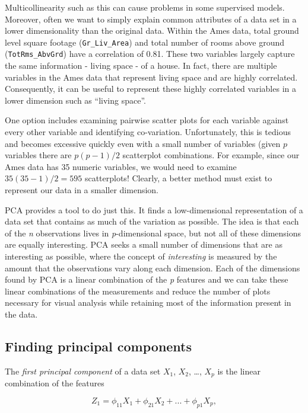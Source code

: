 \documentclass[]{book}
\theoremstyle{definition}
\theoremstyle{definition}
\theoremstyle{definition}
\theoremstyle{remark}
\begin{document}
Multicollinearity such as this can cause problems in some supervised
models. Moreover, often we want to simply explain common attributes of a
data set in a lower dimensionality than the original data. Within the
Ames data, total ground level square footage (\texttt{Gr\_Liv\_Area})
and total number of rooms above ground (\texttt{TotRms\_AbvGrd}) have a
correlation of 0.81. These two variables largely capture the same
information - living space - of a house. In fact, there are multiple
variables in the Ames data that represent living space and are highly
correlated. Consequently, it can be useful to represent these highly
correlated variables in a lower dimension such as ``living space''.

One option includes examining pairwise scatter plots for each variable
against every other variable and identifying co-variation.
Unfortunately, this is tedious and becomes excessive quickly even with a
small number of variables (given \(p\) variables there are \(p(p-1)/2\)
scatterplot combinations. For example, since our Ames data has 35
numeric variables, we would need to examine \(35(35-1)/2 = 595\)
scatterplots! Clearly, a better method must exist to represent our data
in a smaller dimension.

PCA provides a tool to do just this. It finds a low-dimensional
representation of a data set that contains as much of the variation as
possible. The idea is that each of the \emph{n} observations lives in
\emph{p}-dimensional space, but not all of these dimensions are equally
interesting. PCA seeks a small number of dimensions that are as
interesting as possible, where the concept of \emph{interesting} is
measured by the amount that the observations vary along each dimension.
Each of the dimensions found by PCA is a linear combination of the
\emph{p} features and we can take these linear combinations of the
measurements and reduce the number of plots necessary for visual
analysis while retaining most of the information present in the data.

\hypertarget{finding-principal-components}{%
\subsection{Finding principal
components}\label{finding-principal-components}}

The \emph{first principal component} of a data set \(X_1\), \(X_2\),
\ldots{}, \(X_p\) is the linear combination of the features

\begin{equation}
\label{eq:pca1}
Z_{1} = \phi_{11}X_{1} + \phi_{21}X_{2} + ... + \phi_{p1}X_{p},
\end{equation}
\end{document}
